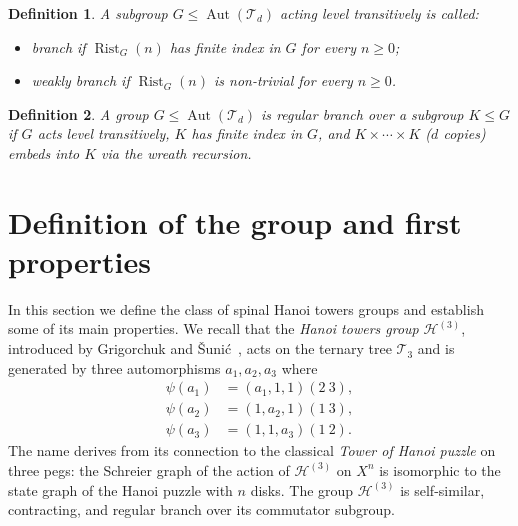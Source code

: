 \documentclass[11pt,leqno]{amsart}
\theoremstyle{plain}
\newtheorem{definition}[definition]{Definition}
\newcommand\T{{\mathcal{T}}}
\DeclareMathOperator{\Aut}{Aut}
\DeclareMathOperator{\Rist}{Rist}
\numberwithin{equation}{section}
\begin{document}
\begin{definition}
A subgroup $G \leq \Aut(\T_d)$ acting level transitively is called:
  \begin{itemize}
    \item \emph{branch} if $\Rist_G(n)$ has finite index in $G$ for every $n \geq 0$;
    \item \emph{weakly branch} if $\Rist_G(n)$ is non-trivial for every $n \geq 0$.
  \end{itemize}
\end{definition}


\begin{definition}
  A group $G \leq \Aut(\T_d)$ is \emph{regular branch} over a subgroup $K \leq G$ if $G$ acts level transitively, $K$ has finite index in $G$, and $K \times \cdots \times K$ ($d$ copies) embeds into $K$ via the wreath recursion.
\end{definition}






\section{Definition of the group and first properties}\label{sec:definition}

In this section we define the class of spinal Hanoi towers groups and establish some of its main properties. We recall that the \emph{Hanoi towers group} $\mathcal{H}^{(3)}$, introduced by Grigorchuk and \v{S}uni\'{c}~\cite{GrigorchukSunik07}, acts on the ternary tree $\T_3$  and is generated by three automorphisms $a_1,a_2,a_3$ where 
\begin{align*}
\psi(a_1)&=(a_1,1,1)(2\ 3),\\
\psi(a_2)&=(1,a_2,1)(1\ 3),\\
\psi(a_3)&=(1,1,a_3)(1\ 2).
\end{align*}
  The name derives from its connection to the classical \emph{Tower of Hanoi puzzle} on three pegs: the Schreier graph of the action of $\mathcal{H}^{(3)}$ on $X^n$ is isomorphic to the state graph of the Hanoi puzzle with $n$ disks. The group $\mathcal{H}^{(3)}$ is self-similar, contracting, and regular branch over its commutator subgroup. 
\end{document}
